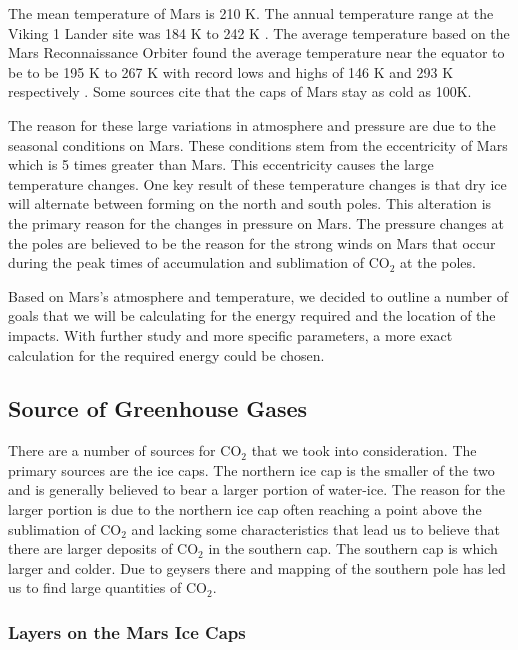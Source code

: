 \documentclass[a4paper]{article}
\begin{document}
    The mean temperature of Mars is 210 K. The annual temperature range at the Viking 1 Lander site was 184 K to 242 K \cite{nasa_mars_????}. The average temperature based on the Mars Reconnaissance Orbiter found the average temperature near the equator to be to be 195 K to 267 K with record lows and highs of 146 K and 293 K respectively \cite{wikipedia_climate_2015}. Some sources cite that the caps of Mars stay as cold as 100K\cite{wikipedia_climate_2015}.
    
    The reason for these large variations in atmosphere and pressure are due to the seasonal conditions on Mars. These conditions stem from the eccentricity of Mars which is 5 times greater than Mars\cite{wikipedia_mars_2015}. This eccentricity causes the large temperature changes. One key result of these temperature changes is that dry ice will alternate between forming on the north and south poles. This alteration is the primary reason for the changes in pressure on Mars. The pressure changes at the poles are believed to be the reason for the strong winds on Mars that occur during the peak times of accumulation and sublimation of CO$_2$ at the poles.
    
    Based on Mars's atmosphere and temperature, we decided to outline a number of goals that we will be calculating for the energy required and the location of the impacts. With further study and more specific parameters, a more exact calculation for the required energy could be chosen.
    
    \subsection{Source of Greenhouse Gases}
    
    There are a number of sources for CO$_2$ that we took into consideration. The primary sources are the ice caps. The northern ice cap is the smaller of the two and is generally believed to bear a larger portion of water-ice. The reason for the larger portion is due to the northern ice cap often reaching a point above the sublimation of CO$_2$ and lacking some characteristics that lead us to believe that there are larger deposits of CO$_2$ in the southern cap. The southern cap is which larger and colder. Due to geysers there and mapping of the southern pole has led us to find large quantities of CO$_2$.
    
    \subsubsection{Layers on the Mars Ice Caps}
    
\end{document}
